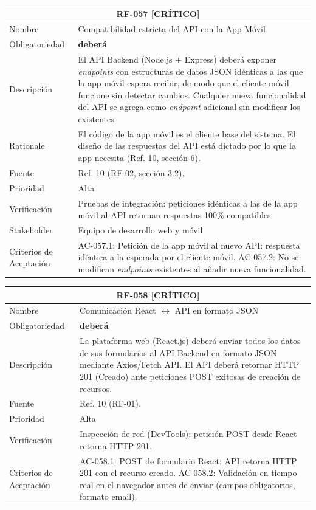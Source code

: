 \documentclass[12pt, a4paper]{article}
\newcommand{\criticomark}{\textcolor{criticolor}{\textbf{[CR\'ITICO]}}}
\begin{document}
\begin{longtable}{|p{3cm}|p{11.5cm}|}
\hline
\multicolumn{2}{|c|}{\textbf{RF-057} \criticomark} \\
\hline
Nombre & Compatibilidad estricta del API con la App M\'ovil \\
\hline
Obligatoriedad & \textbf{deber\'a} \\
\hline
Descripci\'on & El API Backend (Node.js + Express) deber\'a exponer \textit{endpoints} con estructuras de datos JSON id\'enticas a las que la app m\'ovil espera recibir, de modo que el cliente m\'ovil funcione sin detectar cambios. Cualquier nueva funcionalidad del API se agrega como \textit{endpoint} adicional sin modificar los existentes. \\
\hline
Rationale & El c\'odigo de la app m\'ovil es el cliente base del sistema. El dise\~no de las respuestas del API est\'a dictado por lo que la app necesita (Ref. 10, secci\'on 6). \\
\hline
Fuente & Ref. 10 (RF-02, secci\'on 3.2). \\
\hline
Prioridad & Alta \\
\hline
Verificaci\'on & Pruebas de integraci\'on: peticiones id\'enticas a las de la app m\'ovil al API retornan respuestas 100\% compatibles. \\
\hline
Stakeholder & Equipo de desarrollo web y m\'ovil \\
\hline
Criterios de Aceptaci\'on &
AC-057.1: Petici\'on de la app m\'ovil al nuevo API: respuesta id\'entica a la esperada por el cliente m\'ovil. \newline
AC-057.2: No se modifican \textit{endpoints} existentes al a\~nadir nueva funcionalidad. \\
\hline
\end{longtable}

\begin{longtable}{|p{3cm}|p{11.5cm}|}
\hline
\multicolumn{2}{|c|}{\textbf{RF-058} \criticomark} \\
\hline
Nombre & Comunicaci\'on React $\leftrightarrow$ API en formato JSON \\
\hline
Obligatoriedad & \textbf{deber\'a} \\
\hline
Descripci\'on & La plataforma web (React.js) deber\'a enviar todos los datos de sus formularios al API Backend en formato JSON mediante Axios/Fetch API. El API deber\'a retornar HTTP 201 (Creado) ante peticiones POST exitosas de creaci\'on de recursos. \\
\hline
Fuente & Ref. 10 (RF-01). \\
\hline
Prioridad & Alta \\
\hline
Verificaci\'on & Inspecci\'on de red (DevTools): petici\'on POST desde React retorna HTTP 201. \\
\hline
Criterios de Aceptaci\'on &
AC-058.1: POST de formulario React: API retorna HTTP 201 con el recurso creado. \newline
AC-058.2: Validaci\'on en tiempo real en el navegador antes de enviar (campos obligatorios, formato email). \\
\hline
\end{longtable}
\end{document}
